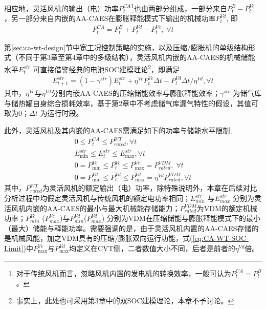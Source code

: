 相应地，灵活风机的输出（电）功率$P_t^{CA}$\footnote{对于传统风机而言，忽略风机内置的发电机的转换效率，一般可认为$P_t^{CA} = P_t^B$。}也由两部分组成，一部分来自$P_t^B - P_t^{Vc}$，另一部分来自内嵌的AA-CAES在膨胀释能模式下输出的机械功率$P_t^{Vd}$, 即
\begin{gather}
\label{eq:CA-WT-Power-Gen}
P_t^{CA} = P_t^B + P_t^{Vd} - P_t^{Vc},\;\forall t
\end{gather}


第\ref{sec:ca-wt-design}节中宽工况控制策略的实施，以及压缩/膨胀机的单级结构形式（不同于第3章至第4章中的多级结构），灵活风机内嵌的AA-CAES的机械储能水平$E_t^{str}$ 可直接借鉴经典的电池SOC建模理论\footnote{事实上，此处也可采用第3章中的双SOC建模理论，本章不予讨论。}，即满足
\begin{gather}
\label{eq:CA-WT-SOC}
E_{t + 1}^{str} = ({1 - {\gamma ^{str}}})E_t^{str} + {\eta ^{Vc}}P_t^{Vc}\Delta t - P_t^{Vd}\Delta t/{\eta ^{Vd}},\forall t
\end{gather}
其中，${\eta ^{Vc}}$与${\eta ^{Vd}}$分别内嵌AA-CAES的压缩储能效率与膨胀释能效率；${\gamma ^{str}}$ 为储气库与储热罐自身综合损耗效率，基于第2章中不考虑储气库漏气特性的假设，其值可取为0；$\Delta t$ 为运行时段。

此外，灵活风机及其内嵌的AA-CAES需满足如下的功率与储能水平限制,
\begin{subequations}
\label{eq:CA-WT-SOC-Limit}
\begin{gather}
0 \le P_t^{CA} \le P_{rated}^{WT}, \forall t \\
E_{\min }^{str} \le E_t^{str} \le E_{\max }^{str},\forall t \\
0 = P_{\min }^{Vc} \le P_t^{Vc} \le P_{\max }^{Vc} = P_{rated}^{VDM},\;\forall t \\
0 = P_{\min }^{Vd} \le P_t^{Vd} \le P_{\max }^{Vd} = {\eta ^{Vd}}P_{rated}^{VDM},\forall t
\end{gather}
\end{subequations}
其中，$P_{rated}^{WT}$为灵活风机的额定输出（电）功率，除特殊说明外，本章在后续对比分析过程中均假定灵活风机与传统风机的额定电功率相同；$E_{min}^{str}$ 与$E_{max}^{str}$ 分别为灵活风机内嵌的AA-CAES的最小与最大机械能存储能力；$P_{rated}^{VDM}$为VDM的额定机械功率；$P_{min}^{Vc}$ ($P_{max}^{Vc}$)与$P_{min}^{Vd}$($P_{max}^{Vd}$) 分别为VDM在压缩储能与膨胀释能模式下的最小（最大）储能与释能功率。需要强调的是，由于灵活风机内置的AA-CAES存储的是机械风能，加之VDM具有的压缩/膨胀双向运行功能，式(\ref{eq:CA-WT-SOC-Limit})中$P_{\max }^{Vc}$与$P_{\max }^{Vd}$均定义在CVT侧，二者数值大小不同，后者是前者的$\eta^{Vd}$倍。

